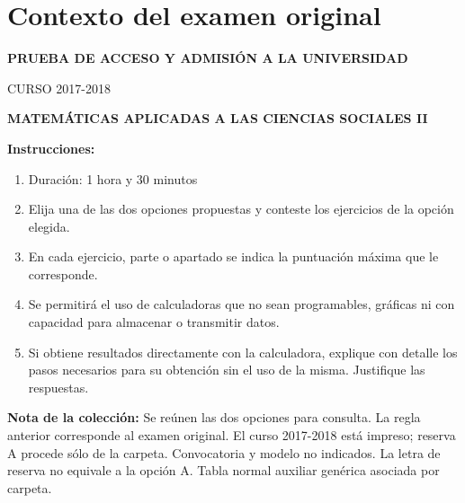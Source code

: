\section*{Contexto del examen original}
\textbf{PRUEBA DE ACCESO Y ADMISIÓN A LA UNIVERSIDAD}\par
CURSO 2017-2018\par
\textbf{MATEMÁTICAS APLICADAS A LAS CIENCIAS SOCIALES II}

\textbf{Instrucciones:}
\begin{enumerate}[label=\textbf{\alph*)}]
  \item Duración: 1 hora y 30 minutos
  \item Elija una de las dos opciones propuestas y conteste los ejercicios de la opción elegida.
  \item En cada ejercicio, parte o apartado se indica la puntuación máxima que le corresponde.
  \item Se permitirá el uso de calculadoras que no sean programables, gráficas ni con capacidad para almacenar o transmitir datos.
  \item Si obtiene resultados directamente con la calculadora, explique con detalle los pasos necesarios para su obtención sin el uso de la misma. Justifique las respuestas.
\end{enumerate}
\noindent\textbf{Nota de la colección:} Se reúnen las dos opciones para consulta.
La regla anterior corresponde al examen original. El curso 2017-2018 está impreso; reserva A procede sólo de la carpeta. Convocatoria y modelo no indicados. La letra de reserva no equivale a la opción A. Tabla normal auxiliar genérica asociada por carpeta.
\par\medskip
